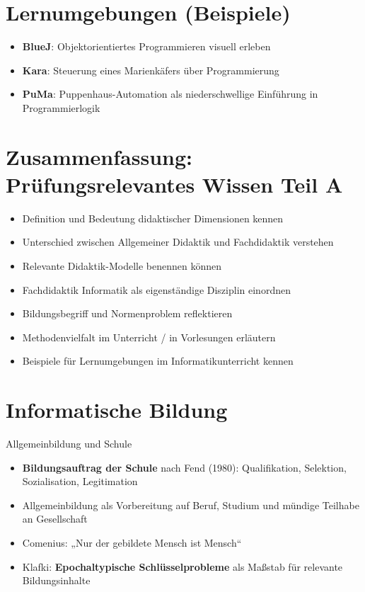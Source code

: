 \documentclass{article}
\begin{document}
\section{Lernumgebungen (Beispiele)}
\begin{itemize}
    \item \textbf{BlueJ}: Objektorientiertes Programmieren visuell erleben
    \item \textbf{Kara}: Steuerung eines Marienkäfers über Programmierung
    \item \textbf{PuMa}: Puppenhaus-Automation als niederschwellige Einführung in Programmierlogik
\end{itemize}

\section{Zusammenfassung: Prüfungsrelevantes Wissen Teil A}

\begin{itemize}
    \item Definition und Bedeutung didaktischer Dimensionen kennen
    \item Unterschied zwischen Allgemeiner Didaktik und Fachdidaktik verstehen
    \item Relevante Didaktik-Modelle benennen können
    \item Fachdidaktik Informatik als eigenständige Disziplin einordnen
    \item Bildungsbegriff und Normenproblem reflektieren
    \item Methodenvielfalt im Unterricht / in Vorlesungen erläutern
    \item Beispiele für Lernumgebungen im Informatikunterricht kennen
\end{itemize}

\section{Informatische Bildung}
\begin{block}{Allgemeinbildung und Schule}
    \begin{itemize}
        \item \textbf{Bildungsauftrag der Schule} nach Fend (1980): Qualifikation, Selektion, Sozialisation, Legitimation
        \item Allgemeinbildung als Vorbereitung auf Beruf, Studium und mündige Teilhabe an Gesellschaft
        \item Comenius: „Nur der gebildete Mensch ist Mensch“
        \item Klafki: \textbf{Epochaltypische Schlüsselprobleme} als Maßstab für relevante Bildungsinhalte
    \end{itemize}
\end{block}
\end{document}
